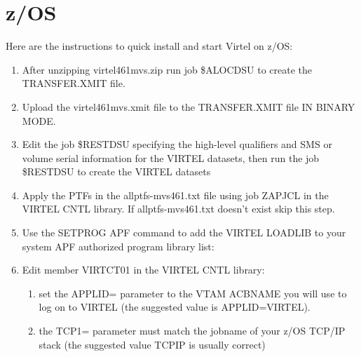 \documentclass[letterpaper,10pt,english]{sphinxmanual}
\begin{document}
\section{z/OS}
\label{\detokenize{Getting_Started:z-os}}
Here are the instructions to quick install and start Virtel on z/OS:
\begin{enumerate}
\def\theenumi{\arabic{enumi}}
\def\labelenumi{\theenumi .}
\makeatletter\def\p@enumii{\p@enumi \theenumi .}\makeatother
\item {} 
After unzipping virtel461mvs.zip run job \$ALOCDSU to create the TRANSFER.XMIT file.

\item {} 
Upload the virtel461mvs.xmit file to the TRANSFER.XMIT file IN BINARY MODE.

\item {} 
Edit the job \$RESTDSU specifying the high-level qualifiers and SMS or volume serial information for the VIRTEL datasets, then run the job \$RESTDSU to create the VIRTEL datasets

\item {} 
Apply the PTFs in the allptfs-mvs461.txt file using job ZAPJCL in the VIRTEL CNTL library. If allptfs-mvs461.txt doesn’t exist skip this step.

\item {} 
Use the SETPROG APF command to add the VIRTEL LOADLIB to your system APF authorized program library list:

\begin{sphinxVerbatim}[commandchars=\\\{\}]
 
\end{sphinxVerbatim}

\item {} 
Edit member VIRTCT01 in the VIRTEL CNTL library:
\begin{enumerate}
\def\theenumii{\alph{enumii}}
\def\labelenumii{(\theenumii )}
\makeatletter\def\p@enumiii{\p@enumii (\theenumii )}\makeatother
\item {} 
set the APPLID= parameter to the VTAM ACBNAME you will use to log
on to VIRTEL (the suggested value is APPLID=VIRTEL).

\item {} 
the TCP1= parameter must match the jobname of your z/OS
TCP/IP stack (the suggested value TCPIP is usually correct)


\end{enumerate}
\end{enumerate}
\end{document}
